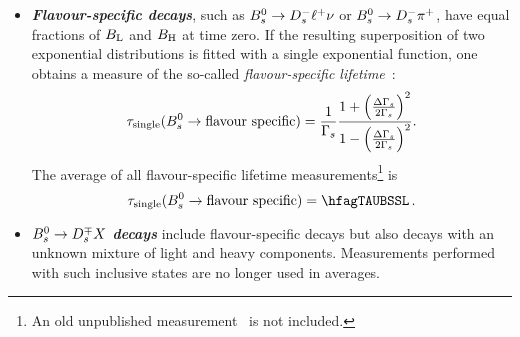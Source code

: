 \begin{itemize}
\item 
{\bf\em Flavour-specific decays},
such as $B^0_s \to D_s^- \ell^+ \nu$
or $B^0_s\to D_s^- \pi^+$, have equal 
fractions of $B_{\rm L}$ and $B_{\rm H}$ at time zero. 
If the resulting superposition of two exponential distributions
is fitted with a single exponential function, 
one obtains a measure of the so-called {\em flavour-specific lifetime}~\cite{Hartkorn:1999ga}:
\begin{equation}
\tau_{\rm single}(\Bs\to \mbox{flavour specific}) = \frac{1}{\Gs}
\frac{{1+\left(\frac{\DGs}{2\Gs}\right)^2}}{{1-\left(\frac{\DGs}{2\Gs}\right)^2}
}.
\labe{fslife}
\end{equation}
The average of all flavour-specific 
\Bs lifetime measurements\footnote{
An old unpublished measurement~\cite{CDFnote7757:2005} is not included.}
is
\begin{equation}
\tau_{\rm single}(\Bs\to \mbox{flavour specific}) = \hfagTAUBSSL \,.
\labe{tau_fs}
\end{equation}

\item
{\bf\em \boldmath $B^0_s\to D_s^{\mp} X$ decays}
include flavour-specific decays but also decays 
with an unknown mixture of light and heavy components. 
Measurements performed with such inclusive states are
no longer used in averages. 


\end{itemize}
